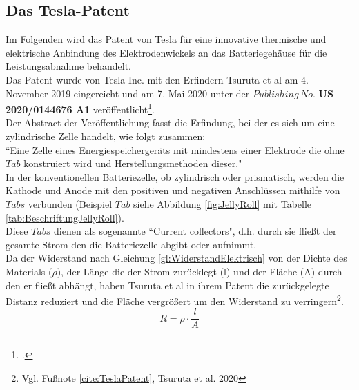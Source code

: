 \newpage
\subsection{Das Tesla-Patent}

Im Folgenden wird das Patent von Tesla für eine innovative thermische und elektrische Anbindung des Elektrodenwickels an das Batteriegehäuse für die Leistungsabnahme behandelt.\\
Das Patent wurde von Tesla Inc. mit den Erfindern Tsuruta et al am 4. November 2019 eingereicht und am 7. Mai 2020 unter der $Publishing\,No.$ \textbf{US 2020/0144676 A1} veröffentlicht\footcite[Vgl.\label{cite:TeslaPatent}][]{TsurutaTesla2020}.\\
Der Abstract der Veröffentlichung fasst die Erfindung, bei der es sich um eine zylindrische Zelle handelt, wie folgt zusammen: \\
``Eine Zelle eines Energiespeichergeräts mit mindestens einer Elektrode die ohne $Tab$ konstruiert wird und Herstellungsmethoden dieser."\\

In der konventionellen Batteriezelle, ob zylindrisch oder prismatisch, werden die Kathode und Anode mit den positiven und negativen Anschlüssen mithilfe von $Tabs$ verbunden (Beispiel $Tab$ siehe Abbildung \ref{fig:JellyRoll} mit Tabelle \ref{tab:BeschriftungJellyRoll}). \\
Diese $Tabs$ dienen als sogenannte ``Current collectors", d.h. durch sie fließt der gesamte Strom den die Batteriezelle abgibt oder aufnimmt. \\
Da der Widerstand nach Gleichung \ref{gl:WiderstandElektrisch} von der Dichte des Materials ($\rho$), der Länge die der Strom zurücklegt (l) und der Fläche (A) durch den er fließt abhängt, haben Tsuruta et al in ihrem Patent die zurückgelegte Distanz reduziert und die Fläche vergrößert um den Widerstand zu verringern\footnote{Vgl. Fußnote \ref{cite:TeslaPatent}, Tsuruta et al. 2020}.
\begin{equation}
	R = \rho \cdot \frac{l}{A}
	\label{gl:WiderstandElektrisch}
\end{equation}

